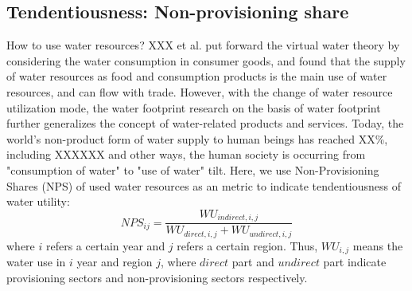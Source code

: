\documentclass[9pt,twoside,lineno]{pnas-new}
\begin{document}
\subsection*{Tendentiousness: Non-provisioning share}
    How to use water resources? XXX et al. put forward the virtual water theory by considering the water consumption in consumer goods, and found that the supply of water resources as food and consumption products is the main use of water resources, and can flow with trade. However, with the change of water resource utilization mode, the water footprint research on the basis of water footprint further generalizes the concept of water-related products and services. Today, the world's non-product form of water supply to human beings has reached XX\%, including XXXXXX and other ways, the human society is occurring from "consumption of water" to "use of water" tilt.
    Here, we use Non-Provisioning Shares (NPS) of used water resources as an metric to indicate tendentiousness of water utility:
    $$ NPS_{ij} = \frac{WU_{indirect, i, j}}{WU_{direct, i, j} + WU_{undirect, i, j}} $$
    where $i$ refers a certain year and $j$ refers a certain region. Thus, $WU_{i,j}$ means the water use in $i$ year and region $j$, where $direct$ part and $undirect$ part indicate provisioning sectors and non-provisioning sectors respectively.
\end{document}
